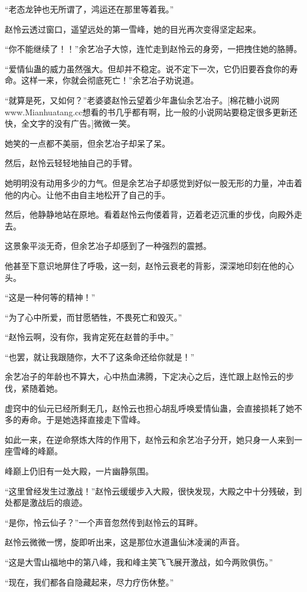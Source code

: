 \begin{this_body}
“老态龙钟也无所谓了，鸿运还在那里等着我。”

赵怜云透过窗口，遥望远处的第一雪峰，她的目光再次变得坚定起来。

“你不能继续了！！”余艺冶子大惊，连忙走到赵怜云的身旁，一把拽住她的胳膊。

“爱情仙蛊的威力虽然强大。但却并不稳定。说不定下一次，它仍旧要吞食你的寿命。这样一来，你就会彻底死亡！”余艺冶子劝说道。

“就算是死，又如何？”老婆婆赵怜云望着少年蛊仙余艺冶子。[棉花糖小说网www.Mianhuatang.cc想看的书几乎都有啊，比一般的小说网站要稳定很多更新还快，全文字的没有广告。]微微一笑。

她笑的一点都不美丽，但余艺冶子却呆了呆。

然后，赵怜云轻轻地抽自己的手臂。

她明明没有动用多少的力气。但是余艺冶子却感觉到好似一股无形的力量，冲击着他的内心。让他不由自主地松开了自己的手。

然后，他静静地站在原地。看着赵怜云佝偻着背，迈着老迈沉重的步伐，向殿外走去。

这景象平淡无奇，但余艺冶子却感到了一种强烈的震撼。

他甚至下意识地屏住了呼吸，这一刻，赵怜云衰老的背影，深深地印刻在他的心头。

“这是一种何等的精神！”

“为了心中所爱，而甘愿牺牲，不畏死亡和毁灭。”

“赵怜云啊，没有你，我肯定死在赵普的手中。”

“也罢，就让我跟随你，大不了这条命还给你就是！”

余艺冶子的年龄也不算大，心中热血沸腾，下定决心之后，连忙跟上赵怜云的步伐，紧随着她。

虚窍中的仙元已经所剩无几，赵怜云也担心胡乱呼唤爱情仙蛊，会直接损耗了她不多的寿命。于是她选择直接走下雪峰。

如此一来，在逆命祭炼大阵的作用下，赵怜云和余艺冶子分开，她只身一人来到一座雪峰的峰巅。

峰巅上仍旧有一处大殿，一片幽静氛围。

“这里曾经发生过激战！”赵怜云缓缓步入大殿，很快发现，大殿之中十分残破，到处都是激战后的痕迹。

“是你，怜云仙子？”一个声音忽然传到赵怜云的耳畔。

赵怜云微微一愣，旋即听出来，这是那位水道蛊仙沐凌澜的声音。

“这是大雪山福地中的第八峰，我和峰主笑飞飞展开激战，如今两败俱伤。”

“现在，我们都各自隐藏起来，尽力疗伤休整。”


\end{this_body}
